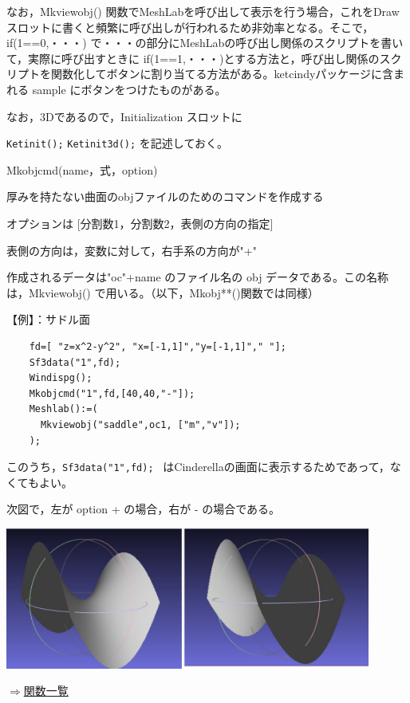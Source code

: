 \documentclass[papersize,a4paper,12pt,uplatex]{jsarticle}
\begin{document}
なお，Mkviewobj() 関数でMeshLabを呼び出して表示を行う場合，これをDrawスロットに書くと頻繁に呼び出しが行われるため非効率となる。そこで，if(1==0,・・・) で・・・の部分にMeshLabの呼び出し関係のスクリプトを書いて，実際に呼び出すときに if(1==1,・・・)とする方法と，呼び出し関係のスクリプトを関数化してボタンに割り当てる方法がある。ketcindyパッケージに含まれる sample にボタンをつけたものがある。
  
  なお，3Dであるので，Initialization スロットに
  
    \verb|Ketinit();|
    \verb|Ketinit3d();|
を記述しておく。

\begin{description}

\hypertarget{mkobjcmd}{}
\item[関数]  Mkobjcmd(name，式，option)
\item[機能]  厚みを持たない曲面のobjファイルのためのコマンドを作成する
\item[説明]  オプションは [分割数1，分割数2，表側の方向の指定]

表側の方向は，変数に対して，右手系の方向が"+"

作成されるデータは"oc"+name のファイル名の obj データである。この名称は，Mkviewobj() で用いる。（以下，Mkobj**()関数では同様）

\vspace{\baselineskip}
【例】：サドル面
\begin{verbatim}
    fd=[ "z=x^2-y^2", "x=[-1,1]","y=[-1,1]"," "];
    Sf3data("1",fd);
    Windispg();
    Mkobjcmd("1",fd,[40,40,"-"]); 
    Meshlab():=(
      Mkviewobj("saddle",oc1, ["m","v"]); 
    );
\end{verbatim}
このうち，\verb|Sf3data("1",fd); | はCinderellaの画面に表示するためであって，なくてもよい。

次図で，左が option + の場合，右が - の場合である。

\includegraphics[bb=0 0 679.53 263.51 , width=12cm]{Fig/meshlab01.pdf}
\vspace{\baselineskip}
\begin{flushright}  \hyperlink{functionlist}{$\Rightarrow$関数一覧}\end{flushright}


\end{description}
\end{document}
